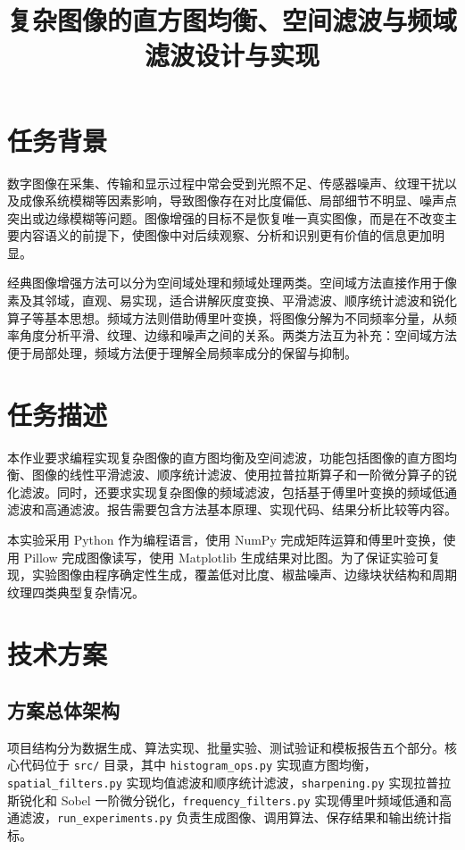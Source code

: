 \documentclass[bwprint]{report}
\title{复杂图像的直方图均衡、空间滤波与频域滤波设计与实现}
\begin{document}
\maketitle
\clearpage

\pagestyle{plain}
\tableofcontents
\newpage
\pagestyle{plain}

\setcounter{page}{1}

\section{任务背景}
数字图像在采集、传输和显示过程中常会受到光照不足、传感器噪声、纹理干扰以及成像系统模糊等因素影响，导致图像存在对比度偏低、局部细节不明显、噪声点突出或边缘模糊等问题。图像增强的目标不是恢复唯一真实图像，而是在不改变主要内容语义的前提下，使图像中对后续观察、分析和识别更有价值的信息更加明显。

经典图像增强方法可以分为空间域处理和频域处理两类。空间域方法直接作用于像素及其邻域，直观、易实现，适合讲解灰度变换、平滑滤波、顺序统计滤波和锐化算子等基本思想。频域方法则借助傅里叶变换，将图像分解为不同频率分量，从频率角度分析平滑、纹理、边缘和噪声之间的关系。两类方法互为补充：空间域方法便于局部处理，频域方法便于理解全局频率成分的保留与抑制。

\section{任务描述}
本作业要求编程实现复杂图像的直方图均衡及空间滤波，功能包括图像的直方图均衡、图像的线性平滑滤波、顺序统计滤波、使用拉普拉斯算子和一阶微分算子的锐化滤波。同时，还要求实现复杂图像的频域滤波，包括基于傅里叶变换的频域低通滤波和高通滤波。报告需要包含方法基本原理、实现代码、结果分析比较等内容。

本实验采用 Python 作为编程语言，使用 NumPy 完成矩阵运算和傅里叶变换，使用 Pillow 完成图像读写，使用 Matplotlib 生成结果对比图。为了保证实验可复现，实验图像由程序确定性生成，覆盖低对比度、椒盐噪声、边缘块状结构和周期纹理四类典型复杂情况。

\section{技术方案}
\subsection{方案总体架构}
项目结构分为数据生成、算法实现、批量实验、测试验证和模板报告五个部分。核心代码位于 \texttt{src/} 目录，其中 \texttt{histogram\_ops.py} 实现直方图均衡，\texttt{spatial\_filters.py} 实现均值滤波和顺序统计滤波，\texttt{sharpening.py} 实现拉普拉斯锐化和 Sobel 一阶微分锐化，\texttt{frequency\_filters.py} 实现傅里叶频域低通和高通滤波，\texttt{run\_experiments.py} 负责生成图像、调用算法、保存结果和输出统计指标。
\end{document}
